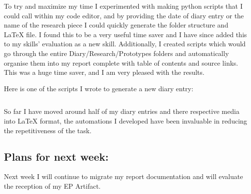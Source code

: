 To try and maximize my time I experimented with making python scripts that I could call within my code editor, and by providing the date of diary entry or the name of the research piece I could quickly generate the folder structure and \LaTeX{} file. I found this to be a very useful time saver and I have since added this to my skills' evaluation as a new skill. Additionally, I created scripts which would go through the entire Diary/Research/Prototypes folders and automatically organise them into my report complete with table of contents and source links. This was a huge time saver, and I am very pleased with the results.

Here is one of the scripts I wrote to generate a new diary entry:
\inputminted[linenos, tabsize=1, breaklines]{python}{Diary/36_WC_7-7-25/media/ScriptedResearch.py}

So far I have moved around half of my diary entries and there respective media into \LaTeX{} format, the automations I developed have been invaluable in reducing the repetitiveness of the task.

\subsection*{Plans for next week:}
Next week I will continue to migrate my report documentation and will evaluate the reception of my EP Artifact.